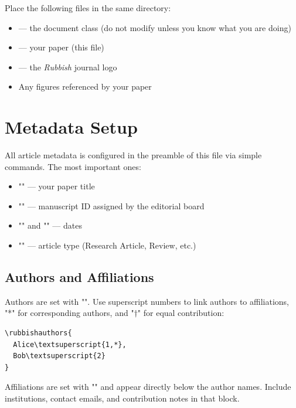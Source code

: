 \documentclass{rubbish}
\begin{document}
\begin{rubbishbody}
Place the following files in the same directory:

\begin{itemize}[leftmargin=*, itemsep=2pt]
  \item {} --- the document class (do not modify
        unless you know what you are doing)
  \item {} --- your paper (this file)
  \item {} --- the \emph{Rubbish} journal logo
  \item Any figures referenced by your paper
\end{itemize}

\section{Metadata Setup}

All article metadata is configured in the preamble of this
 file via simple commands. The most important ones:

\begin{itemize}[leftmargin=*, itemsep=2pt]
  \item "" --- your paper title
  \item "" --- manuscript
        ID assigned by the editorial board
  \item "" and
        "" --- dates
  \item "" --- article type
        (Research Article, Review, etc.)
\end{itemize}

\subsection{Authors and Affiliations}

Authors are set with "".
Use superscript numbers to link authors to affiliations, "*" for
corresponding authors, and "$\dagger$" for equal
contribution:

\begin{verbatim}
\rubbishauthors{
  Alice\textsuperscript{1,*},
  Bob\textsuperscript{2}
}
\end{verbatim}

\noindent Affiliations are set with
"" and appear directly
below the author names. Include institutions, contact emails, and
contribution notes in that block.


\end{rubbishbody}
\end{document}
